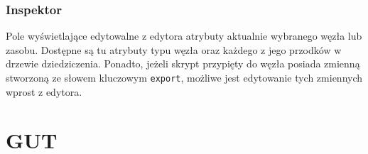 \subsubsection{Inspektor}
Pole wyświetlające edytowalne z edytora atrybuty aktualnie wybranego węzła lub zasobu. Dostępne są tu atrybuty typu węzła oraz każdego z jego przodków w drzewie dziedziczenia. Ponadto, jeżeli skrypt przypięty do węzła posiada zmienną stworzoną ze słowem kluczowym \texttt{export}, możliwe jest edytowanie tych zmiennych wprost z edytora.




\section{GUT}